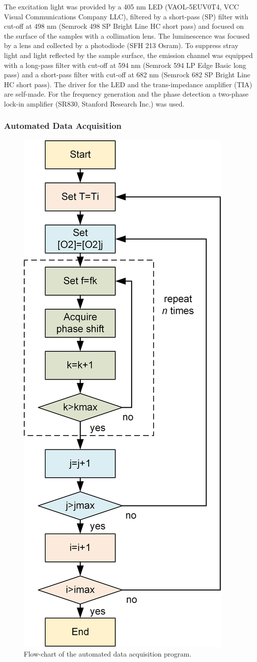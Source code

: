 \documentclass[9pt,twocolumn,twoside,pdftex]{optica}
\begin{document}
The excitation light was provided by a 405 nm LED (VAOL-5EUV0T4, VCC Visual Communications Company LLC), filtered by a short-pass (SP) filter with cut-off at 498 nm (Semrock 498 SP Bright Line HC short pass) and focused on the surface of the samples with a collimation lens. The luminescence was focused by a lens and collected by a photodiode (SFH 213 Osram).
To suppress stray light and light reflected by the sample surface, the emission channel was equipped with a long-pass filter with cut-off at 594 nm (Semrock 594 LP Edge Basic long pass) and a short-pass filter with cut-off at 682 nm (Semrock 682 SP Bright Line HC short pass). The driver for the LED and the trans-impedance amplifier (TIA) are self-made.
For the frequency generation and the phase detection a two-phase lock-in amplifier (SR830, Stanford Research Inc.) was used. 

\subsubsection{Automated Data Acquisition}
\label{Data}

\begin{figure}[b!]
\centering
\includegraphics[keepaspectratio, width=5.8 cm]{flow-chart.png}
\caption{Flow-chart of the automated data acquisition program.}
\label{fig:auto-data}
\end{figure}
\end{document}
